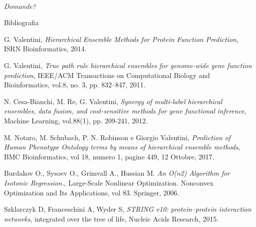 \documentclass[9pt]{beamer}
\begin{document}
\begin{frame}{}
  \centering \Large
  \emph{\\Domande?}
\end{frame}
\begin{tframe}{Bibliografia}
\begin{itemize}
\footnotesize{
\item G. Valentini,\emph{ Hierarchical Ensemble Methods for Protein Function Prediction}, ISRN Bioinformatics, 2014.
\item G. Valentini, \emph{True path rule hierarchical ensembles for genome-wide gene function prediction}, IEEE/ACM Transactions on Computational Biology and Bioinformatics, vol.8, no. 3, pp. 832–847, 2011.
\item N. Cesa-Bianchi, M. Re, G. Valentini, \emph{Synergy of multi-label hierarchical ensembles, data fusion, and cost-sensitive methods for gene functional inference}, Machine Learning, vol.88(1), pp. 209-241, 2012.
\item M. Notaro, M. Schubach, P. N. Robinson e Giorgio Valentini, \emph{Prediction of Human Phenotype Ontology terms by means of hierarchical ensemble methods}, BMC Bioinformatics, vol 18, numero 1, pagine 449, 12 Ottobre, 2017.
\item Burdakov O., Sysoev O., Grimvall A., Hussian M. \emph{An O(n2) Algorithm for Isotonic Regression.}, Large-Scale Nonlinear Optimization. Nonconvex Optimization and Its Applications, vol 83. Springer, 2006.
\item Szklarczyk D, Franceschini A, Wyder S, \emph{STRING v10: protein–protein interaction networks}, integrated over the tree of life, Nucleic Acids Research, 2015.}
\end{itemize}
\end{tframe}
\end{document}
